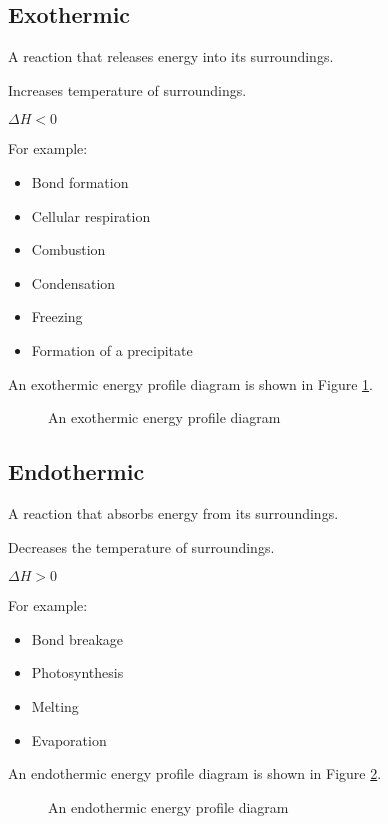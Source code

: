 \documentclass[a4paper,11pt]{article}
\begin{document}
\subsection{Exothermic}

A reaction that releases energy into its surroundings.

Increases temperature of surroundings.

$\Delta H < 0$

For example:

\begin{itemize}
\item Bond formation
\item Cellular respiration
\item Combustion
\item Condensation
\item Freezing
\item Formation of a precipitate
\end{itemize}

An exothermic energy profile diagram is shown in Figure \ref{fig:exothermic}.

\begin{center}
\begin{figure}
\caption{An exothermic energy profile diagram}
\label{fig:exothermic}
\end{figure}
\end{center}


\subsection{Endothermic}

A reaction that absorbs energy from its surroundings.

Decreases the temperature of surroundings.

$\Delta H > 0$

For example:

\begin{itemize}
\item Bond breakage
\item Photosynthesis
\item Melting
\item Evaporation
\end{itemize}

An endothermic energy profile diagram is shown in Figure \ref{fig:endothermic}.

\begin{figure}
\begin{center}
\caption{An endothermic energy profile diagram}
\label{fig:endothermic}
\end{center}
\end{figure}
\end{document}
